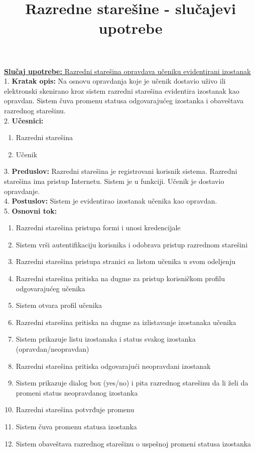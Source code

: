 \documentclass{article}
\title{Razredne starešine - slučajevi upotrebe}
\begin{document}
\maketitle

\underline{\textbf{Slučaj upotrebe:} Razredni starešina opravdava učeniku evidentirani izostanak} \\

1. \textbf{Kratak opis:} Na osnovu opravdanja koje je učenik dostavio uživo ili elektronski skenirano kroz sistem razredni starešina evidentira izostanak kao opravdan. Sistem čuva promenu statusa odgovarajućeg izostanka i obaveštava razrednog starešinu. \\

2. \textbf{Učesnici:}
\begin{enumerate} [label=(\alph*)]
\item Razredni starešina
\item Učenik
\end{enumerate} 

3. \textbf{Preduslov:} Razredni starešina je registrovani korisnik sistema. Razredni starešina ima pristup Internetu. Sistem je u funkciji. Učenik je dostavio opravdanje. \\

4. \textbf{Postuslov:} Sistem je evidentirao izostanak učenika kao opravdan.\\

5. \textbf{Osnovni tok:} 
\begin{enumerate} [label=(\alph*)]
\item Razredni starešina pristupa formi i unosi kredencijale 
\item Sistem vrši autentifikaciju korisnika i odobrava pristup razrednom starešini
\item Razredni starešina pristupa stranici sa listom učenika u svom odeljenju
\item Razredni starešina pritiska na dugme za pristup korisničkom profilu odgovarajućeg učenika
\item Sistem otvara profil učenika
\item Razredni starešina pritiska na dugme za izlistavanje izostanaka učenika
\item Sistem prikazuje listu izostanaka i status svakog izostanka (opravdan/neopravdan)
\item Razredni starešina pritiska odgovarajući neopravdani izostanak
\item Sistem prikazuje dialog box (yes/no) i pita razrednog starešinu da li želi da promeni status neopravdanog izostanka
\item Razredni starešina potvrđuje promenu
\item Sistem čuva promenu statusa izostanka
\item Sistem obaveštava razrednog starešinu o uspešnoj promeni statusa izostanka
\end{enumerate}
\end{document}
